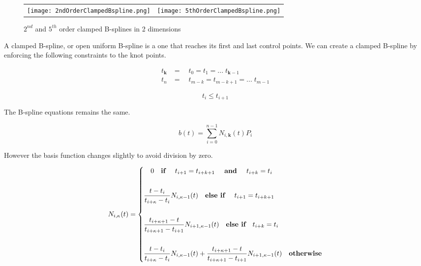 \documentclass{article}
\begin{document}
\begin{figure}[h]
\begin{tabular}{ll}
\texttt{[image: 2ndOrderClampedBspline.png]}
&
\texttt{[image: 5thOrderClampedBspline.png]}
\end{tabular}
\caption{$2^{nd}$ and $5^{th}$ order clamped B-splines in 2 dimensions}
\label{Fig:Race}
\end{figure}

A clamped B-spline, or open uniform B-spline is a one that reaches its first and last control points. We can create a clamped B-spline by enforcing the following constraints to the knot points.

\begin{equation}
\begin{aligned}
    t_\textbf{k} & = \quad t_0 = t_1 = ... \; t_{\textbf{k}-1} \\
    t_n & = \quad  t_{m-k} = t_{m-k+1} = ... \; t_{m-1}
\end{aligned}
\end{equation}

\begin{equation}
    t_i \leq t_{i+1}
\end{equation}

The B-spline equations remains the same.

  \begin{equation}
      b(t) = \sum^{n-1}_{i=0} N_{i,\textbf{k}}(t) P_i
  \end{equation}

However the basis function changes slightly to avoid division by zero.


  \begin{equation} \label{eq:Basis function equation}
  N_{i,\kappa}(t) = \begin{dcases}  \quad 0 \quad  \textbf{if } \quad t_{i+1} = t_{i+k+1} \quad  \textbf{ and } \quad t_{i+k} = t_{i} \\  \\ \frac{t - t_i}{t_{i+\kappa} - t_i} N_{i,\kappa-1}(t) \quad  \textbf{else if } \quad t_{i+1} = t_{i+k+1} \\ \\ 
  \frac{t_{i+\kappa+1} - t}{t_{i+\kappa+1}-t_{i+1}} N_{i+1 , \kappa-1}(t) \quad \textbf{else if} \quad t_{i+k} = t_{i} \\ \\
  \frac{t - t_i}{t_{i+\kappa} - t_i} N_{i,\kappa-1}(t) + \frac{t_{i+\kappa+1} - t}{t_{i+\kappa+1}-t_{i+1}} N_{i+1 , \kappa-1}(t) \quad \textbf{otherwise}
  \end{dcases}
  \end{equation}
  
\end{document}
